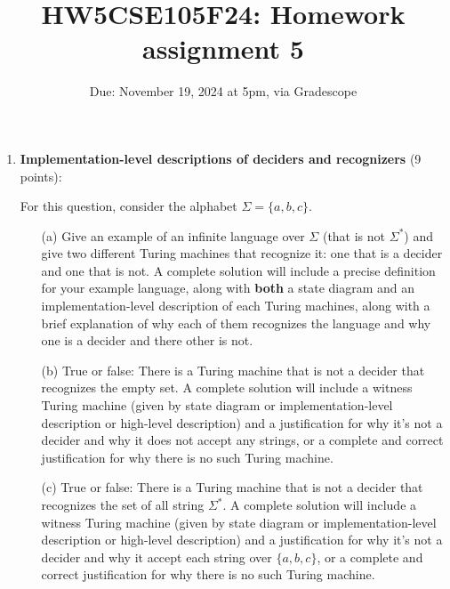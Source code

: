 \begin{enumerate}[wide, labelwidth=!, labelindent=0pt]
\begin{enumerate}
\end{enumerate}



\item\textbf{Implementation-level descriptions of deciders and recognizers} (9 points):

For this question, consider the alphabet $\Sigma = \{a,b,c\}$.
\begin{enumerate}
\item[(a)]\gradeCorrect Give an example of an infinite language over $\Sigma$ (that is not $\Sigma^*$) and give
two different Turing machines that recognize it: one that is a decider and one that is not.
A complete solution will include a precise definition for your example language, 
along with {\bf both} a state diagram and an implementation-level description 
of each Turing machines, along with a brief explanation of why each of them recognizes
the language and why one is a decider and there other is not.

\item[(b)]\gradeComplete True or false: There is a Turing machine that is not a decider that recognizes 
the empty set. A complete solution will include a witness Turing machine (given by 
state diagram or implementation-level description or high-level description) and a justification 
for why it's not a decider and why it does not accept any strings, or a complete and correct
justification for why there is no such Turing machine.

\item[(c)]\gradeComplete True or false: There is a Turing machine that is not a decider that recognizes 
the set of all string $\Sigma^*$.  A complete solution will include a witness Turing machine 
(given by 
state diagram or implementation-level description or high-level description) and a justification 
for why it's not a decider and why it accept each string over $\{a,b,c\}$, or a complete and correct
justification for why there is no such Turing machine.
\end{enumerate}
\end{enumerate}
\newpage

\title{HW5CSE105F24: Homework assignment 5}
\date{Due: November 19, 2024 at 5pm, via Gradescope}



\maketitle
\thispagestyle{fancy}

